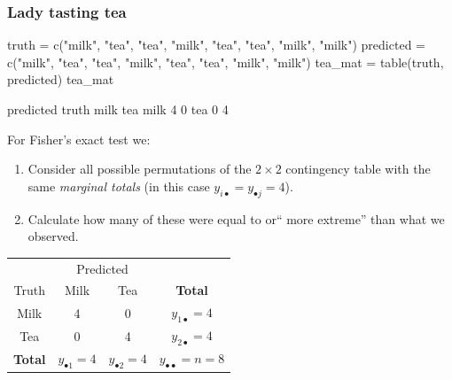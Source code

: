 \documentclass[a4paper]{article}
\begin{document}
\subsubsection{Lady tasting tea}
\begin{Schunk}
\begin{Sinput}
truth = c("milk", "tea", "tea", "milk", "tea", "tea", "milk", "milk")
predicted = c("milk", "tea", "tea", "milk", "tea", "tea", "milk", "milk")
tea_mat = table(truth, predicted)
tea_mat
\end{Sinput}
\begin{Soutput}
      predicted
truth  milk tea
  milk    4   0
  tea     0   4
\end{Soutput}
\end{Schunk}
For Fisher's exact test we:
\begin{enumerate}
	\item Consider all possible permutations of the  \( 2 \times 2 \) contingency table with the same \textit{marginal totals} (in this case \( y_{i\bullet} = y_{\bullet j} = 4 \)).
	\item Calculate how many of these were equal to or`` more extreme'' than what we observed.
\end{enumerate}
\begin{table}[H]
	\centering
	\begin{tabular}{@{}c|cc|c@{}}
	\toprule
				   & \multicolumn{2}{c|}{Predicted}                  & \\
	Truth          & Milk                   & Tea                    & \textbf{Total}                   \\ \midrule
	Milk           & 4                      & 0                      & \( y_{1\bullet} = 4 \)           \\
	Tea            & 0                      & 4                      & \( y_{2\bullet} = 4 \)           \\ \midrule
	\textbf{Total} & \( y_{\bullet1} = 4 \) & \( y_{\bullet2} = 4 \) & \( y_{\bullet\bullet} = n = 8 \) \\ \bottomrule
	\end{tabular}
\end{table}
\end{document}
